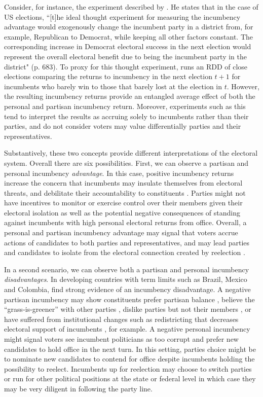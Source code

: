 \documentclass[12pt]{amsart}
\numberwithin{equation}{section}
\theoremstyle{definition}
\theoremstyle{definition}
\theoremstyle{definition}
\begin{document}
Consider, for instance, the experiment described by \citet{lee_2008}. He states that in the case of US elections, ``[t]he ideal thought experiment for measuring the incumbency advantage would exogenously change the incumbent party in a district from, for example, Republican to Democrat, while keeping all other factors constant. The corresponding increase in Democrat electoral success in the next election would represent the overall electoral benefit due to being the incumbent party in the district" (p. 683). To proxy for this thought experiment, \citet{lee_2008} runs an RDD of close elections comparing the returns to incumbency in the next election $t+1$ for incumbents who barely win to those that barely lost at the election in $t$. However, the resulting incumbency returns provide an entangled average effect of both the personal and partisan incumbency return. Moreover, experiments such as this tend to interpret the results as accruing solely to incumbents rather than their parties, and do not consider voters may value differentially parties and their representatives. 

Substantively, these two concepts provide different interpretations of the electoral system. Overall there are six possibilities. First, we can observe a  partisan and personal incumbency \emph{advantage}. In this case, positive incumbency returns increase the concern that incumbents may insulate themselves from electoral threats, and debilitate their accountability to constituents \citep{ashworth_etal_2019, cox_katz_2002}. Parties might not have incentives to monitor or exercise control over their members given their electoral isolation as well as the potential negative consequences of standing against incumbents with high personal electoral returns from office. Overall, a personal and partisan incumbency advantage may signal that voters accrue actions of candidates to both parties and representatives, and may lead parties and candidates to isolate from the electoral connection created by reelection \citep{mayhew_1974}. 

 In a second scenario, we can observe both a partisan and personal incumbency \emph{disadvantages}. In developing countries with term limits such as Brazil, Mexico and Colombia, \citet{klasnja_titiunik_2017} find strong evidence of an incumbency disadvantage. A negative partisan incumbency may show constituents prefer partisan balance \citep{folke_snyder_2012}, believe the ``grass-is-greener'' with other parties \citep{bhatia_turan_2013}, dislike parties but not their members \citep{parker_davidson_1979}, or have suffered from institutional changes such as redistricting that decreases electoral support of incumbents \citep{ansolabehere_snyder_2000, desposato_petrocik_2003}, for example. A negative personal incumbency might signal voters see incumbent politicians as too corrupt and prefer new candidates to hold office in the next turn. In this setting, parties choice might be to nominate new candidates to contend for office despite incumbents holding the possibility to reelect. Incumbents up for reelection may choose to switch parties or run for other political positions at the state or federal level in which case they may be very diligent in following the party line. 
  
\end{document}
